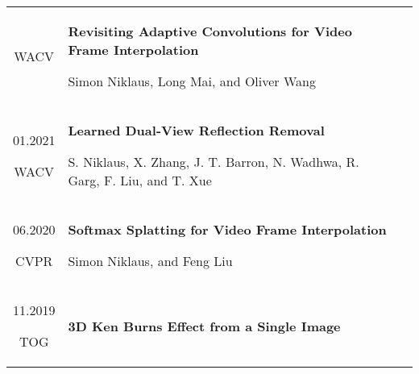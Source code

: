 \documentclass[10pt]{article}
\begin{document}
\begin{tabular}{C Z D}
{		\vspace{-0.05cm}
		
		{\scriptsize WACV}
	}
	&
	{
		{\bf Revisiting Adaptive Convolutions for Video Frame Interpolation}
		
		\vspace{0.00cm}
		
		{\scriptsize Simon Niklaus, Long Mai, and Oliver Wang}
		
%		
		
		\vspace{0.0cm}
	}
	\\
	{
		01.2021
		
		\vspace{-0.05cm}
		
		{\scriptsize WACV}
	}
	&
	{
		{\bf Learned Dual-View Reflection Removal}
		
		\vspace{0.00cm}
		
		{\scriptsize S. Niklaus, X. Zhang, J. T. Barron, N. Wadhwa, R. Garg, F. Liu, and T. Xue}
		
%		
		
		\vspace{0.0cm}
	}
	\\
	{
		06.2020
		
		\vspace{-0.05cm}
		
		{\scriptsize CVPR}
	}
	&
	{
		{\bf Softmax Splatting for Video Frame Interpolation}
		
		\vspace{0.00cm}
		
		{\scriptsize Simon Niklaus, and Feng Liu}
		
%		
		
		\vspace{0.0cm}
	}
	\\
	{
		11.2019
		
		\vspace{-0.05cm}
		
		{\scriptsize TOG}
	}
	&
	{
		{\bf 3D Ken Burns Effect from a Single Image}
		
		\vspace{0.00cm}
		
}
\end{tabular}
\end{document}
